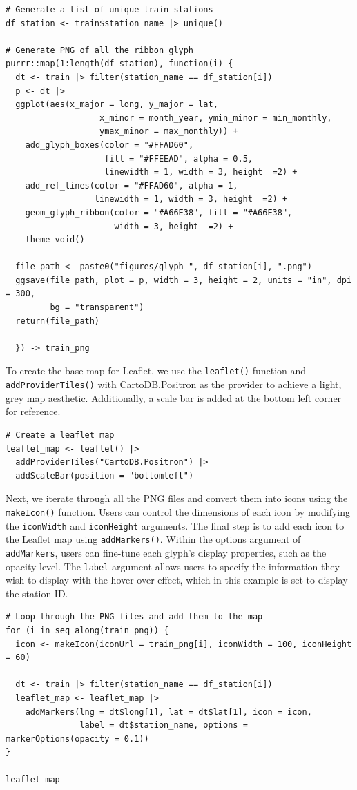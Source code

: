 \begin{verbatim}
# Generate a list of unique train stations
df_station <- train$station_name |> unique()

# Generate PNG of all the ribbon glyph
purrr::map(1:length(df_station), function(i) {
  dt <- train |> filter(station_name == df_station[i])
  p <- dt |>
  ggplot(aes(x_major = long, y_major = lat,
                   x_minor = month_year, ymin_minor = min_monthly,
                   ymax_minor = max_monthly)) +
    add_glyph_boxes(color = "#FFAD60", 
                    fill = "#FFEEAD", alpha = 0.5,
                    linewidth = 1, width = 3, height  =2) +
    add_ref_lines(color = "#FFAD60", alpha = 1,
                  linewidth = 1, width = 3, height  =2) +
    geom_glyph_ribbon(color = "#A66E38", fill = "#A66E38",
                      width = 3, height  =2) +
    theme_void() 
  
  file_path <- paste0("figures/glyph_", df_station[i], ".png")
  ggsave(file_path, plot = p, width = 3, height = 2, units = "in", dpi = 300,
         bg = "transparent")
  return(file_path)

  }) -> train_png 
\end{verbatim}

To create the base map for Leaflet, we use the \texttt{leaflet()} function and \texttt{addProviderTiles()} with \href{https://github.com/CartoDB/basemap-styles}{CartoDB.Positron} as the provider to achieve a light, grey map aesthetic. Additionally, a scale bar is added at the bottom left corner for reference.

\begin{verbatim}
# Create a leaflet map 
leaflet_map <- leaflet() |>
  addProviderTiles("CartoDB.Positron") |>
  addScaleBar(position = "bottomleft")
\end{verbatim}

Next, we iterate through all the PNG files and convert them into icons using the \texttt{makeIcon()} function. Users can control the dimensions of each icon by modifying the \texttt{iconWidth} and \texttt{iconHeight} arguments. The final step is to add each icon to the Leaflet map using \texttt{addMarkers()}. Within the options argument of \texttt{addMarkers}, users can fine-tune each glyph's display properties, such as the opacity level. The \texttt{label} argument allows users to specify the information they wish to display with the hover-over effect, which in this example is set to display the station ID.

\begin{verbatim}
# Loop through the PNG files and add them to the map
for (i in seq_along(train_png)) {
  icon <- makeIcon(iconUrl = train_png[i], iconWidth = 100, iconHeight = 60)

  dt <- train |> filter(station_name == df_station[i])
  leaflet_map <- leaflet_map |>
    addMarkers(lng = dt$long[1], lat = dt$lat[1], icon = icon,
               label = dt$station_name, options = markerOptions(opacity = 0.1))
}

leaflet_map
\end{verbatim}

